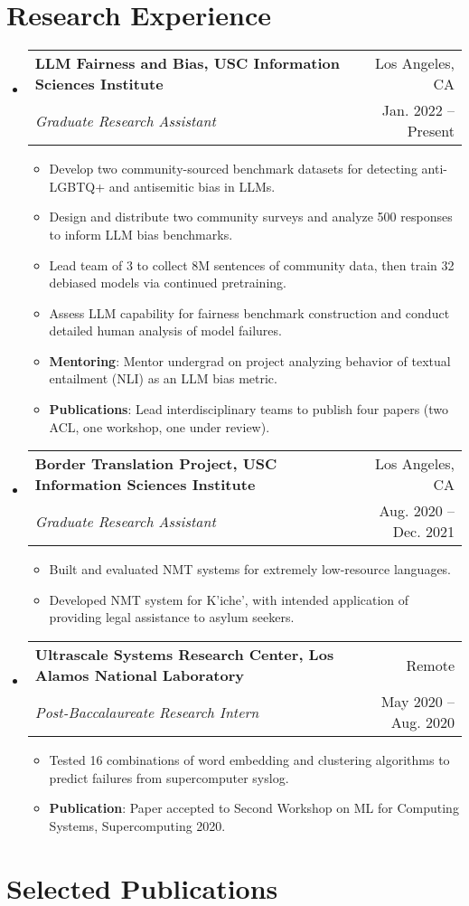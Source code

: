 \documentclass[letterpaper,11pt]{article}
\makeatletter
\newcommand{\resumeItemWithHeader}[2]{
  \item\small{
    \textbf{#1}{: #2 \vspace{-2pt}}
  }
}
\newcommand{\resumeItem}[1]{
  \item\small{
  {#1 \vspace{-2pt}}
  }
}
\newcommand{\resumeSubheading}[4]{
  \vspace{-1pt} \item
    \begin{tabular*}{0.97\textwidth}{l@{\extracolsep{\fill}}r}
      \textbf{#1} & #2 \\
      \textit{\small#3} & \small #4 \\
      
    \end{tabular*}\vspace{-5pt}
}
\newcommand{\resumeSubHeadingListStart}{\begin{itemize}[label={}, leftmargin=*]}
\newcommand{\resumeSubHeadingListEnd}{\end{itemize}}
\newcommand{\resumeItemListStart}{\begin{itemize}}
\newcommand{\resumeItemListEnd}{\end{itemize}\vspace{-5pt}}
\makeatother
\begin{document}
\section{Research Experience}
\resumeSubHeadingListStart
    \resumeSubheading
      {LLM Fairness and Bias, USC Information Sciences Institute}{Los Angeles, CA}
      {Graduate Research Assistant}{Jan. 2022 -- Present}
      \resumeItemListStart
      \resumeItem{Develop two community-sourced benchmark datasets for detecting anti-LGBTQ+ and antisemitic bias in LLMs.}
      \resumeItem{Design and distribute two community surveys and analyze 500 responses to inform LLM bias benchmarks.}
      \resumeItem{Lead team of 3 to collect 8M sentences of community data, then train 32 debiased models via continued pretraining.}
      \resumeItem{Assess LLM capability for  fairness benchmark construction and conduct detailed human analysis of model failures.}
      \resumeItemWithHeader{Mentoring}{Mentor undergrad on project analyzing behavior of textual entailment (NLI) as an LLM bias metric.}
      \resumeItemWithHeader{Publications}{Lead interdisciplinary teams to publish four papers (two ACL, one workshop, one under review).}
      \resumeItemListEnd

    \resumeSubheading
      {Border Translation Project, USC Information Sciences Institute}{Los Angeles, CA}
      {Graduate Research Assistant}{Aug. 2020 -- Dec. 2021}
      \resumeItemListStart
      \resumeItem{Built and evaluated NMT systems for extremely low-resource languages.}
      \resumeItem{Developed NMT system for K'iche', with intended application of providing legal assistance to asylum seekers.}
      \resumeItemListEnd

    \resumeSubheading
      {Ultrascale Systems Research Center, Los Alamos National Laboratory}{Remote}
      {Post-Baccalaureate Research Intern}{May 2020 -- Aug. 2020}
      \resumeItemListStart
      \resumeItem{Tested 16 combinations of word embedding and clustering algorithms to predict failures from supercomputer syslog.} 
      \resumeItemWithHeader{Publication}{Paper accepted to Second Workshop on ML for Computing Systems, Supercomputing 2020.}
      \resumeItemListEnd
      
    \resumeSubHeadingListEnd
\section{Selected Publications}
\begin{refsection}
\nocite{*}
\printbibliography[heading=none]
\end{refsection}
\end{document}
